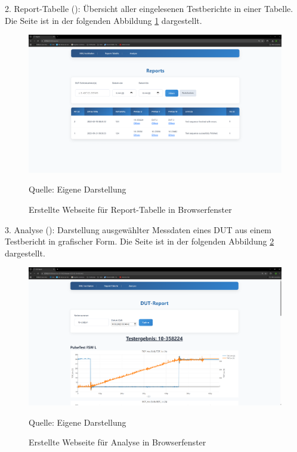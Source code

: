 2. Report-Tabelle (): Übersicht aller eingelesenen Testberichte in einer Tabelle.
Die Seite ist in der folgenden Abbildung \ref{fig: Webseite für Report-Tabelle} dargestellt.

\begin{figure}[H]
    \centering
    \includegraphics[width=1\textwidth]{Grafiken/Bild Reports}
    \caption{Erstellte Webseite für Report-Tabelle in Browserfenster}
    \label{fig: Webseite für Report-Tabelle}
    {Quelle: Eigene Darstellung}
\end{figure}

3. Analyse (): Darstellung ausgewählter Messdaten eines DUT aus einem Testbericht in grafischer Form.
Die Seite ist in der folgenden Abbildung \ref{fig: Webseite für Analyse} dargestellt.

\begin{figure}[H]
    \centering
    \includegraphics[width=1\textwidth]{Grafiken/Bild DUT-Report}
    \caption{Erstellte Webseite für Analyse in Browserfenster}
    \label{fig: Webseite für Analyse}
    {Quelle: Eigene Darstellung}
\end{figure}


